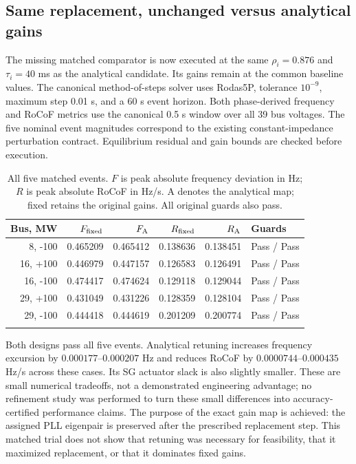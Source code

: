 \subsection{Same replacement, unchanged versus analytical gains}
The missing matched comparator is now executed at the same
$\rho_i=0.876$ and $\tau_i=40$ ms as the analytical candidate.
Its gains remain at the common baseline values.
The canonical method-of-steps solver uses Rodas5P, tolerance $10^{-9}$,
maximum step 0.01 s, and a 60 s event horizon. Both phase-derived
frequency and RoCoF metrics use the canonical 0.5 s window over all
39 bus voltages. The five nominal event magnitudes correspond to
the existing constant-impedance perturbation contract.
Equilibrium residual and gain bounds are checked before execution.

\begin{table}[htbp]\centering\small
\caption{All five matched events. $F$ is peak absolute frequency deviation
in Hz; $R$ is peak absolute RoCoF in Hz/s. A denotes the analytical map;
fixed retains the original gains. All original guards also pass.}
\begin{tabular}{rrrrrl}\toprule
Bus, MW & $F_{\rm fixed}$ & $F_{\rm A}$ & $R_{\rm fixed}$ & $R_{\rm A}$ & Guards\\\midrule
8, -100 & 0.465209 & 0.465412 & 0.138636 & 0.138451 & Pass / Pass\\
16, +100 & 0.446979 & 0.447157 & 0.126583 & 0.126491 & Pass / Pass\\
16, -100 & 0.474417 & 0.474624 & 0.129118 & 0.129044 & Pass / Pass\\
29, +100 & 0.431049 & 0.431226 & 0.128359 & 0.128104 & Pass / Pass\\
29, -100 & 0.444418 & 0.444619 & 0.201209 & 0.200774 & Pass / Pass\\
\\[-2.5mm]\bottomrule
\end{tabular}\label{tab:pairedclosure}
\end{table}

Both designs pass all five events. Analytical retuning increases
frequency excursion by $0.000177$--$0.000207$ Hz and reduces RoCoF
by $0.0000744$--$0.000435$ Hz/s across these cases. Its SG actuator
slack is also slightly smaller. These are small numerical tradeoffs,
not a demonstrated engineering advantage; no refinement study was
performed to turn these small differences into accuracy-certified
performance claims. The purpose of the exact gain map is achieved:
the assigned PLL eigenpair is preserved after the prescribed
replacement step. This matched trial does not show that retuning
was necessary for feasibility, that it maximized replacement, or
that it dominates fixed gains.

